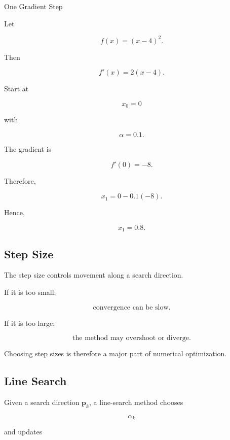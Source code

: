 \begin{workedexamplebox}{One Gradient Step}

Let

\[
f(x)
=
(x-4)^2.
\]

Then

\[
f'(x)
=
2(x-4).
\]

Start at

\[
x_0=0
\]

with

\[
\alpha=0.1.
\]

The gradient is

\[
f'(0)=-8.
\]

Therefore,

\[
x_1
=
0
-
0.1(-8).
\]

Hence,

\begin{answerbox}
\[
\boxed{
x_1=0.8.
}
\]
\end{answerbox}

\end{workedexamplebox}

\subsection{Step Size}
\label{subsec:optimization-step-size}

The step size controls movement along a search direction.

If it is too small:

\[
\boxed{
\text{convergence can be slow}.
}
\]

If it is too large:

\[
\boxed{
\text{the method may overshoot or diverge}.
}
\]

Choosing step sizes is therefore a major part of numerical optimization.

\subsection{Line Search}
\label{subsec:line-search-preview}

Given a search direction \(\mathbf{p}_k\), a line-search method chooses

\[
\alpha_k
\]

and updates

